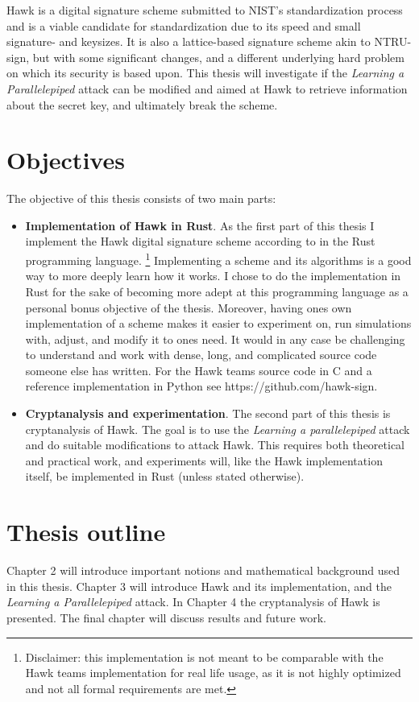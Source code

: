 Hawk \cite{HawkSpec24} is a digital signature scheme submitted to NIST's standardization process and is a viable candidate for standardization
due to its speed and small signature- and keysizes. It is also a lattice-based signature scheme akin to NTRU-sign, but with some significant changes, and a different underlying hard problem on which its security is based upon. 
This thesis will investigate if the \textit{Learning a Parallelepiped} attack can be modified and aimed at Hawk to retrieve information about the secret key, and ultimately break the scheme.

\section{Objectives}
The objective of this thesis consists of two main parts:
\begin{itemize}
    \item \textbf{Implementation of Hawk in Rust}. As the first part of this thesis I implement the Hawk digital signature scheme according to \cite{HawkSpec24} in the Rust programming language.
        \footnote{Disclaimer: this implementation is not meant to be comparable with the Hawk teams implementation for real life usage, as it is not highly optimized and not all formal requirements are met.}
    Implementing a scheme and its algorithms is a good way to more deeply learn how it works. I chose to do the implementation in Rust for the sake of becoming more adept at this programming language as a personal bonus objective of the thesis.
    Moreover, having ones own implementation of a scheme makes it easier to experiment on, run simulations with, adjust, and modify it to ones need. It would in any case be challenging to understand and work with dense, long, 
    and complicated source code someone else has written. For the Hawk teams source code in C and a reference implementation in Python see https://github.com/hawk-sign.


\item \textbf{Cryptanalysis and experimentation}. The second part of this thesis is cryptanalysis of Hawk. The goal is to use the \textit{Learning a parallelepiped} attack and do suitable modifications to attack Hawk. 
    This requires both theoretical and practical work, and experiments will, like the Hawk implementation itself, be implemented in Rust (unless stated otherwise).
\end{itemize}
\section{Thesis outline}
Chapter 2 will introduce important notions and mathematical background used in this thesis. Chapter 3 will introduce Hawk and its implementation, and the \textit{Learning a Parallelepiped} attack.
In Chapter 4 the cryptanalysis of Hawk is presented. The final chapter will discuss results and future work.

